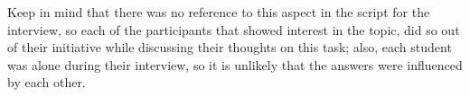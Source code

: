 Keep in mind that there was no reference to this aspect in the script for the interview, so each of the participants that showed interest in the topic, did so out of their initiative while discussing their thoughts on this task; also, each student was alone during their interview, so it is unlikely that the answers were influenced by each other.


